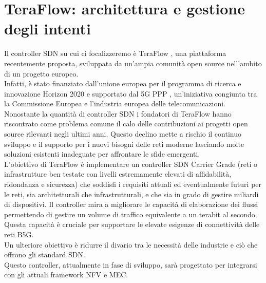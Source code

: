 \chapter{TeraFlow: architettura e gestione degli intenti}
\label{cap:teraflow}
Il controller SDN su cui ci focalizzeremo è TeraFlow \cite{TeraFlow}, una piattaforma recentemente proposta, sviluppata da un'ampia comunità open source nell'ambito di un progetto europeo. 
\\Infatti, è stato finanziato dall'unione europea per il programma di ricerca e innovazione Horizon 2020 \cite{Horizon} e supportato dal 5G PPP \cite{5GPPP}, un'iniziativa congiunta tra la Commissione Europea e l'industria europea delle telecomunicazioni.
\\Nonostante la quantità di controller SDN i fondatori di TeraFlow hanno riscontrato come problema comune il calo delle contribuzioni ai progetti open source rilevanti negli ultimi anni.
Questo declino mette a rischio il continuo sviluppo e il supporto per i nuovi bisogni delle reti moderne lasciando molte soluzioni esistenti inadeguate per affrontare le sfide emergenti.
\\L'obiettivo di TeraFlow è implementare un controller SDN Carrier Grade (reti o infrastrutture ben testate con livelli estremamente elevati di affidabilità, ridondanza e sicurezza)
che soddisfi i requisiti attuali ed eventualmente futuri per le reti, sia architetturali che infrastrutturali, e che sia in grado di gestire miliardi di dispositivi.
Il controller mira a migliorare le capacità di elaborazione dei flussi permettendo di gestire un volume di traffico equivalente a un terabit al secondo. 
Questa capacità è cruciale per supportare le elevate esigenze di connettività delle reti B5G.
\\Un ulteriore obiettivo è ridurre il divario tra le necessità delle industrie e ciò che offrono gli standard SDN.
\\Questo controller, attualmente in fase di sviluppo, sarà progettato per integrarsi con gli attuali framework NFV e MEC.
